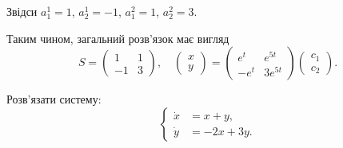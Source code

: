 \begin{solution}
    Звідси $a_1^1 = 1$, $a_2^1 = - 1$, $a_1^2 = 1$, $a_2^2 = 3$. \parvskip
    
    Таким чином, загальний розв'язок має вигляд
    \[ S = \begin{pmatrix} 1 & 1 \\ -1 & 3 \end{pmatrix}, \quad \begin{pmatrix} x \\ y \end{pmatrix} = \begin{pmatrix} e^t & e^{5t} \\ -e^t & 3 e^{5 t} \end{pmatrix} \begin{pmatrix} c_1 \\ c_2 \end{pmatrix}. \]
\end{solution}

\begin{example}
    Розв'язати систему:
    \[ \left\{ \begin{aligned}
        \dot x &= x + y, \\
        \dot y &= -2 x + 3 y.
    \end{aligned} \right. \]
\end{example}
 
